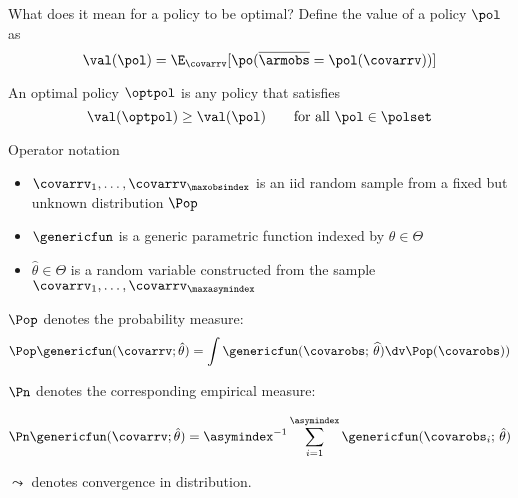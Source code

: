 \documentclass[aspectratio=169, professionalfonts]{beamer}
\begin{document}
\begin{frame}{What does it mean for a policy to be optimal?}
	Define the value of a policy $\pol$ as
	\begin{equation}
		\val(\pol) = \E_{\covarrv}[\po(\overline{\armobs} = \pol(\covarrv))]
	\end{equation}

	\vfill

	An optimal policy $\optpol$ is any policy that satisfies
	\begin{equation}
		\val(\optpol) \geq \val(\pol) \qquad \text{for all }\pol \in \polset
	\end{equation}
\end{frame}



\begin{frame}{Operator notation}
	\begin{itemize}
		\item $\covarrv_1, \ldots, \covarrv_{\maxobsindex}$ is an iid random sample from a
		      fixed but unknown distribution $\Pop$
		\item $\genericfun$ is a generic parametric function indexed by $\theta \in \Theta$
		\item $\hat{\theta} \in \Theta$ is a random variable constructed from the sample
		      $\covarrv_1, \ldots, \covarrv_{\maxasymindex}$
	\end{itemize}
	\vfill

	$\Pop$ denotes the probability measure:
	\begin{equation*}
		\Pop \genericfun(\covarrv; \hat{\theta}) = \int \genericfun(\covarobs;\,\widehat{\theta}) \dv
		\Pop(\covarobs))
	\end{equation*}

	\vfill $\Pn$ denotes the corresponding empirical measure:

	\begin{equation*}
		\Pn \genericfun(\covarrv; \hat{\theta}) = \asymindex^{-1}\sum_{i =
			1}^{\asymindex} \genericfun(\covarobs_{i};\,\hat{\theta})
	\end{equation*}
	\vfill

	$\leadsto$ denotes convergence in distribution.

	\vfill
\end{frame}
\end{document}
